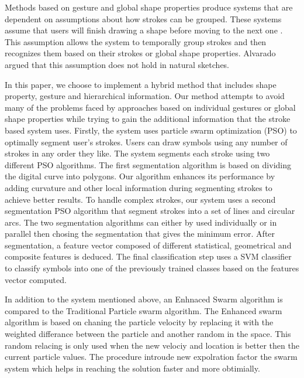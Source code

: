 \documentclass[preprint,1p,times,review]{elsarticle}
\begin{document}
Methods based on gesture and global shape properties produce systems that are
dependent on assumptions about how strokes can be grouped. These systems assume
that users will finish drawing a shape before moving to the next one
\cite{Cali63,geometrydomain49}. This assumption allows the system to temporally
group strokes and then recognizes them based on their strokes or global shape
properties. Alvarado \cite{AlvaradoDigital} argued that this assumption does not
hold in natural sketches.


In this paper, we choose to implement a hybrid method that includes shape
property, gesture and hierarchical information. Our method attempts to avoid
many of the problems faced by approaches based on individual gestures or global
shape properties while trying to gain the additional information that the stroke
based system uses. Firstly, the system uses particle swarm optimization (PSO) to
optimally segment user's strokes. Users can draw symbols using any number of
strokes in any order they like. The system segments each stroke using two
different PSO algorithms. The first segmentation algorithm is based on dividing
the digital curve into polygons\cite{PolygonApproximationPSO}. Our algorithm
enhances its performance by adding curvature and other local information during
segmenting strokes to achieve better results. To handle complex strokes, our
system uses a second segmentation PSO algorithm that segment strokes into a set
of lines and circular arcs. The two segmentation algorithms can either by used
individually or in parallel then chosing the segmentation that gives the minimum
error. After segmentation, a feature vector composed of different statistical,
geometrical and composite features is deduced. The final classification step
uses a SVM classifier to classify symbols into one of the previously trained
classes based on the features vector computed\cite{mypaper}.

 In addition to the system mentioned above, an Enhnaced Swarm algorithm is compared to the Traditional Particle swarm algorithm\cite{stockPaper}. The Enhanced swarm algorithm is based on chaning the particle velocity by replacing it with the weighted differance between the particle and another random in the space. This random relacing is only used when the new velociy and location is better then the current particle values. The procedure introude new expolration factor the swarm system which helps in reaching the solution faster and more obtimially.
\end{document}
